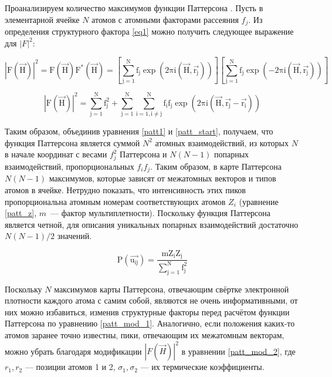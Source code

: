 Проанализируем количество максимумов функции Паттерсона \cite{rossmann_patterson_2001}. Пусть в элементарной ячейке $N$ атомов с атомными факторами рассеяния $f_j$. Из определения структурного фактора \ref{eq1} можно получить следующее выражение для $|F|^2$:

\begin{equation}
	\mathrm{|F(\overrightarrow{H})|^2 = F(\overrightarrow{H})F^*(\overrightarrow{H}) = \left[\sum\limits_{j=1}^N f_j \exp(2\pi i (\overrightarrow{H}, \overrightarrow{r_j}))\right]\left[\sum\limits_{j=1}^N f_j \exp(-2\pi i (\overrightarrow{H}, \overrightarrow{r_j}))\right]}
\end{equation}

\begin{equation}\label{patt1}
	\mathrm{|F(\overrightarrow{H})|^2 = \sum\limits_{j=1}^N f_j^2 + \sum\limits_{j=1}^N\sum\limits_{i=1, i\neq j}^N f_if_j\exp(2\pi i (\overrightarrow{H}, \overrightarrow{r_j}-\overrightarrow{r_i}))}
\end{equation}

Таким образом, объединив уравнения \ref{patt1} и \ref{patt_start}, получаем, что функция Паттерсона является суммой $N^2$ атомных взаимодействий, из которых $N$ в начале координат с весами $f_j^2$ Паттерсона и $N(N-1)$ попарных взаимодействий, пропорциональных $f_if_j$. Таким образом, в карте Паттерсона $N(N-1)$ максимумов, которые зависят от межатомных векторов и типов атомов в ячейке. Нетрудно показать, что интенсивность этих пиков пропорциональна атомным номерам соответствующих атомов $Z_i$ (уравнение \ref{patt_z}, $m$~--- фактор мультиплетности). Поскольку функция Паттерсона является четной, для описания уникальных попарных взаимодействий достаточно $N(N-1)/2$ значений. 

\begin{equation}
	\mathrm{P(\overrightarrow{u_{ij}}) = \frac{mZ_iZ_j}{\sum\limits_{j=1}^N f_j^2} }
\end{equation}

Поскольку $N$ максимумов карты Паттерсона, отвечающим свёртке электронной плотности каждого атома с самим собой, являются не очень информативными, от них можно избавиться, изменив структурные факторы перед расчётом функции Паттерсона по уравнению \ref{patt_mod_1}. Аналогично, если положения каких-то атомов заранее точно известны, пики, отвечающим их межатомным векторам, можно убрать благодаря модификации $|F(\overrightarrow{H})|^2$ в уравнении \ref{patt_mod_2}, где $r_1, r_2$ --- позиции атомов 1 и 2, $\sigma_1, \sigma_2$ --- их термические коэффициенты.

